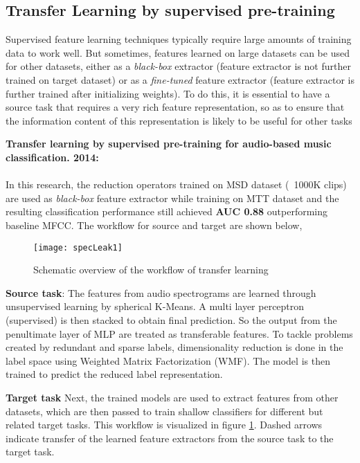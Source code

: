 \subsection{Transfer Learning by supervised pre-training}
\label{transfer}
Supervised feature learning techniques  typically require large amounts of training data to work well. But sometimes, features learned on large datasets can be used for other datasets, either as a \textit{black-box} extractor (feature extractor is not further trained on target dataset) or as a \textit{fine-tuned} feature extractor (feature extractor is further trained after initializing weights). To do this, it is essential to have a source task that requires a very rich feature representation, so as to ensure that the information content of this representation is likely to be useful for other tasks
\bigskip

\noindent \textbf{Transfer learning by supervised pre-training for audio-based music classification. 2014\cite{TransferLearning}:}\\
\\
In this research, the reduction operators trained on MSD dataset (~1000K clips) are used as \textit{black-box} feature extractor while training on MTT dataset and the resulting classification performance still achieved \textbf{AUC 0.88} outperforming baseline MFCC. The workflow for source and target are shown below,
\begin{figure}[h] 
\centering
\texttt{[image: specLeak1]}
\caption{Schematic overview of the workflow of transfer learning\cite{TransferLearning}}
 \label{fig:transfer learning}
 \end{figure}
\FloatBarrier
\bigskip

\noindent \textbf{Source task}: 
The features from audio spectrograms are learned through unsupervised learning by spherical K-Means. A multi layer perceptron (supervised) is then stacked to obtain final prediction. So the output from the penultimate layer of MLP are treated as transferable features. To tackle problems created by redundant and sparse labels, dimensionality reduction is done in the label space using Weighted Matrix Factorization (WMF). The model is then trained to predict the reduced label representation.
\bigskip

\noindent \textbf{Target task}
Next,  the trained models are used to extract features from other datasets, which are then passed to train shallow classifiers for different but related target tasks. This workflow is visualized in figure \ref{fig:transfer learning}. Dashed arrows indicate transfer of the learned feature extractors from the source task to the target task.
\bigskip


